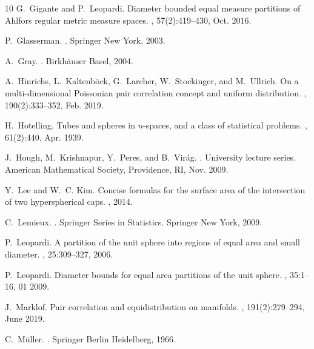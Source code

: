 \documentclass[a4paper,11pt]{amsart}
\begin{document}
\begin{thebibliography}{10}
G.~Gigante and P.~Leopardi.
\newblock Diameter bounded equal measure partitions of {A}hlfors regular metric measure spaces.
, 57(2):419–430, Oct. 2016.

P.~Glasserman.
.
\newblock Springer New York, 2003.

A.~Gray.
.
\newblock Birkh\"{a}user Basel, 2004.

A.~Hinrichs, L.~Kaltenb\"{o}ck, G.~Larcher, W.~Stockinger, and M.~Ullrich.
\newblock On a multi-dimensional {P}oissonian pair correlation concept and uniform distribution.
, 190(2):333–352, Feb. 2019.

H.~Hotelling.
\newblock Tubes and spheres in $n$-spaces, and a class of statistical problems.
, 61(2):440, Apr. 1939.

J.~Hough, M.~Krishnapur, Y.~Peres, and B.~Vir{\'a}g.
.
\newblock University lecture series. American Mathematical Society, Providence, RI, Nov. 2009.

Y.~Lee and W.~C. Kim.
\newblock Concise formulas for the surface area of the intersection of two hyperspherical caps.
, 2014.

C.~Lemieux.
.
\newblock Springer Series in Statistics. Springer New York, 2009.

P.~Leopardi.
\newblock A partition of the unit sphere into regions of equal area and small diameter.
, 25:309--327, 2006.

P.~Leopardi.
\newblock Diameter bounds for equal area partitions of the unit sphere.
, 35:1--16, 01 2009.

J.~Marklof.
\newblock Pair correlation and equidistribution on manifolds.
, 191(2):279–294, June 2019.

C.~M\"{u}ller.
.
\newblock Springer Berlin Heidelberg, 1966.


\end{thebibliography}
\end{document}
